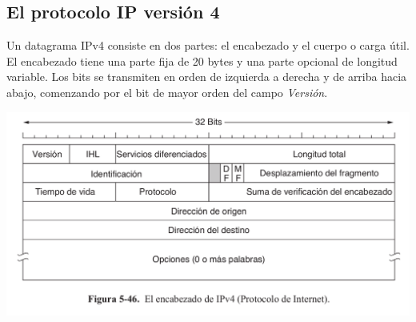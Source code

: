 \documentclass[10pt,a4paper]{report}
\begin{document}
	\subsection{El protocolo IP versión 4}
	Un datagrama IPv4 consiste en dos partes: el encabezado y el cuerpo o carga útil. El encabezado tiene una parte fija de 20 bytes y una parte opcional de longitud variable. Los bits se transmiten en orden de izquierda a derecha y de arriba hacia abajo, comenzando por el bit de mayor orden del campo \textit{Versión}.
	
	\begin{center}
		\includegraphics[scale=0.3]{./imagenes/encabezadoIP.png} 
	\end{center}
	
\end{document}
